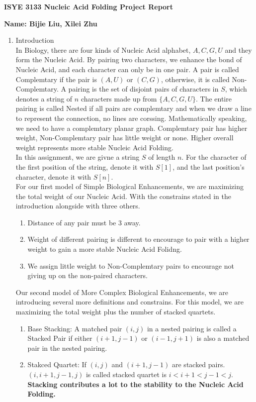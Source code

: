 \documentclass[11pt]{article}
\begin{document}
{\noindent\Large\textbf{ISYE 3133 Nucleic Acid Folding Project Report}}

\vspace{.25in}

{\large
\noindent
\textbf{Name: Bijie Liu, Xilei Zhu} \smallskip \\




\begin{enumerate}
\item  Introduction\\
In Biology, there are four kinds of Nucleic Acid alphabet, $A,C,G,U$ and they form the Nucleic Acid. By pairing two characters, we enhance the bond of Nucleic Acid, and each character can only be in one pair. A pair is called Complemtary if the pair is $(A,U)$ or $(C,G)$, otherwise, it is called Non-Complemtary. A pairing is the set of disjoint pairs of characters in $S$, which denotes a string of $n$ characters made up from $\{A,C,G,U\}$. The entire pairing is called Nested if all pairs are complemtary and when we draw a line to represent the connection, no lines are corssing. Mathematically speaking, we need to have a complemtary planar graph. Complemtary pair has higher weight, Non-Complemtary pair has little weight or none. Higher overall weight represents more stable Nucleic Acid Folding.\\

In this assignment, we are givne a string $S$ of length $n$. For the character of the first position of the string, denote it with $S[1]$, and the last position's character, denote it with $S[n]$.\\
For our first model of Simple Biological Enhancements, we are maximizing the total weight of our Nucleic Acid. With the constrains stated in the introduction alongside with three others. 
\begin{enumerate}
    \item Distance of any pair must be 3 away.
    \item Weight of different pairing is different to encourage to pair with a higher weight to gain a more stable Nucleic Acid Folidng.
    \item We assign little weight to Non-Complemtary pairs to encourage not giving up on the non-paired characters.
\end{enumerate}


Our second model of More Complex Biological Enhancements, we are introducing several more definitions and constrains. For this model, we are maximizing the total weight plus the number of stacked quartets.
\begin{enumerate}
    \item Base Stacking: A matched pair $(i,j)$ in a nested pairing is called a Stacked Pair if either $(i+1,j-1)$ or $(i-1,j+1)$ is also a matched pair in the nested pairing.
    \item Stakced Quartet: If $(i,j)$ and $(i+1,j-1)$ are stacked pairs. $(i,i+1,j-1,j)$ is called stacked quartet is $i<i+1<j-1<j$.\\
    \textbf{Stacking contributes a lot to the stability to the Nucleic Acid Folding.}


\end{enumerate}
\end{enumerate}}
\end{document}
